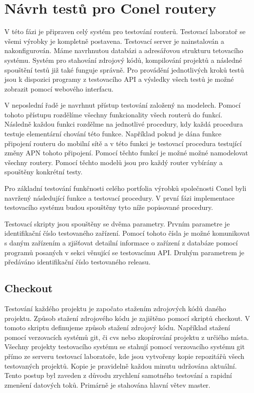 \chapter{Návrh testů pro Conel routery}
V této fázi je připraven celý systém pro testování routerů. Testovací laboratoř se všemi výrobky je kompletně postavena. Testovací server je nainstalován a nakonfigurován. Máme navrhnutou databázi a adresářovou strukturu tetovacího systému. Systém pro stahování zdrojový kódů, kompilování projektů a následné spouštění testů již také funguje správně. Pro provádění jednotlivých kroků testů jsou k dispozici programy z testovacího API a výsledky všech testů je možné zobrazit pomocí webového interfacu.

V neposlední řadě je navrhnut přístup testování založený na modelech. Pomocí tohoto přístupu rozdělíme všechny funkcionality všech routerů do funkcí. Následně každou funkci rozdělme na jednotlivé procedury, kdy každá procedura testuje elementární chování této funkce. Například pokud je dána funkce připojení routeru do mobilní sítě a v této funkci je testovací procedura testující změny APN tohoto připojení. Pomocí těchto funkcí je možné možné namodelovat všechny routery. Pomocí těchto modelů jsou pro každý router vybírány a spouštěny konkrétní testy.

Pro základní testování funkčnosti celého portfolia výrobků společnosti Conel byli navržený následující funkce a testovací procedury. V první fázi implementace testovacího systému budou spouštěny tyto níže popisované procedury.

Testovací skripty jsou spouštěny se dvěma parametry. Prvním parametre je identifikační číslo testovaného zařízení. Pomocí tohoto čísla je možné komunikovat s daným zařízením a zjišťovat detailní informace o zařízení z databáze pomocí programů posaných v sekci věnující se testovacímu API. Druhým parametrem je předáváno identifikační číslo testovaného releasu.

\section{Checkout}
Testování každého projektu je započato stažením zdrojových kódů daného projektu. Způsob stažení zdrojového kódu je zajištěno pomocí skriptů checkout. V tomoto skriptu definujeme způsob stažení zdrojový kódu. Například stažení pomocí verzovacích systémů git, či cvs nebo zkopírování projektu z určiého místa. Všechny projekty testovacího systému se stahují pomocí verzovacího systému git přímo ze serveru testovací laboratoře, kde jsou vytvořeny kopie repozitářů všech testovaných projektů. Kopie je pravidelně každou minutu udržována aktuální. Tento postup byl zaveden z důvodu zrychlení samotného testování a rapidní zmenšení datových toků. Primárně je stahována hlavní větev master.

